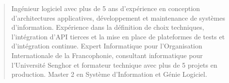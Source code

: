 \documentclass[10pt,a4paper,ragged2e,withhyper]{altacv}
\begin{document}

    
    \makecvheader

    \begin{quote}
    \normalsize Ingénieur logiciel avec plus de 5 ans d'expérience en conception d'architectures applicatives, développement et maintenance de systèmes d'information. Expérience dans la définition de choix techniques, l'intégration d'API tierces et la mise en place de plateformes de tests et d'intégration continue. Expert Informatique pour l'Organisation Internationale de la Francophonie, consultant informatique pour l'Université Senghor et formateur technique avec plus de 5 projets en production. Master 2 en Système d'Information et Génie Logiciel.
    \end{quote}
    \vspace{-0.5em}

\end{document}
